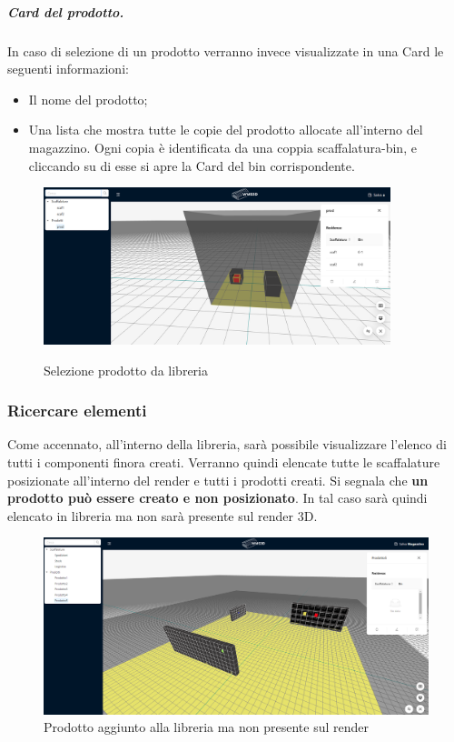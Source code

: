                 \subparagraph{Card del prodotto.}
                 In caso di selezione di un prodotto verranno invece visualizzate in una Card le seguenti informazioni:
                \begin{itemize}
                    \item Il nome del prodotto;
                    \item Una lista che mostra tutte le copie del prodotto allocate all'interno del magazzino. Ogni copia è identificata da una coppia scaffalatura-bin, e cliccando su di esse si apre la Card del bin corrispondente.
                \end{itemize}
                \begin{figure}[H]
                    \centering
                    \includegraphics[width=0.9\textwidth]{images/selezione_prodotto_card.png}
                    \label{sel_prod}
                    \caption{Selezione prodotto da libreria}
                \end{figure}

            \subsubsection{Ricercare elementi} \label{sec:principale:esplorare:ricerca}
                Come accennato, all'interno della libreria, sarà possibile visualizzare l'elenco di tutti i componenti finora creati.
                Verranno quindi elencate tutte le scaffalature posizionate all'interno del render e tutti i prodotti creati. Si segnala che \textbf{un prodotto può essere creato
                e non posizionato}. In tal caso sarà quindi elencato in libreria ma non sarà presente sul render 3D.\\
                \begin{figure}[H]
                    \centering
                    \includegraphics[width=1.0\textwidth]{images/prodotto_no_render.png}
                    \caption{Prodotto aggiunto alla libreria ma non presente sul render}
                \end{figure}
                
